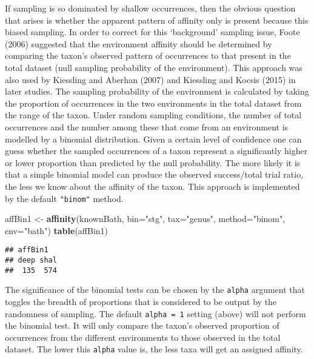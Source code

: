 \documentclass[]{article}
\newenvironment{Shaded}{\begin{snugshade}}{\end{snugshade}}
\newcommand{\KeywordTok}[1]{\textcolor[rgb]{0.13,0.29,0.53}{\textbf{{#1}}}}
\newcommand{\DataTypeTok}[1]{\textcolor[rgb]{0.13,0.29,0.53}{{#1}}}
\newcommand{\StringTok}[1]{\textcolor[rgb]{0.31,0.60,0.02}{{#1}}}
\newcommand{\NormalTok}[1]{{#1}}
\begin{document}
If sampling is so dominated by shallow occurrences, then the obvious
question that arises is whether the apparent pattern of affinity only is
present because this biased sampling. In order to correct for this
`background' sampling issue, Foote (2006) suggested that the environment
affinity should be determined by comparing the taxon's observed pattern
of occurrences to that present in the total dataset (null sampling
probability of the environment). This approach was also used by
Kiessling and Aberhan (2007) and Kiessling and Kocsis (2015) in later
studies. The sampling probability of the environment is calculated by
taking the proportion of occurrences in the two environments in the
total dataset from the range of the taxon. Under random sampling
conditions, the number of total occurrences and the number among these
that come from an environment is modelled by a binomial distribution.
Given a certain level of confidence one can guess whether the sampled
occurrences of a taxon represent a significantly higher or lower
proportion than predicted by the null probability. The more likely it is
that a simple binomial model can produce the observed success/total
trial ratio, the less we know about the affinity of the taxon. This
approach is implemented by the default \texttt{"binom"} method.

\begin{Shaded}
\begin{Highlighting}[]
\NormalTok{affBin1 <-}\StringTok{ }\KeywordTok{affinity}\NormalTok{(knownBath, }\DataTypeTok{bin=}\StringTok{"stg"}\NormalTok{, }\DataTypeTok{tax=}\StringTok{"genus"}\NormalTok{, }
  \DataTypeTok{method=}\StringTok{"binom"}\NormalTok{, }\DataTypeTok{env=}\StringTok{"bath"}\NormalTok{)}
\KeywordTok{table}\NormalTok{(affBin1)}
\end{Highlighting}
\end{Shaded}

\begin{verbatim}
## affBin1
## deep shal 
##  135  574
\end{verbatim}

The significance of the binomial tests can be chosen by the
\texttt{alpha} argument that toggles the breadth of proportions that is
considered to be output by the randomness of sampling. The default
\texttt{alpha\ =\ 1} setting (above) will not perform the binomial test.
It will only compare the taxon's observed proportion of occurrences from
the different environments to those observed in the total dataset. The
lower this \texttt{alpha} value is, the less taxa will get an assigned
affinity.
\end{document}
